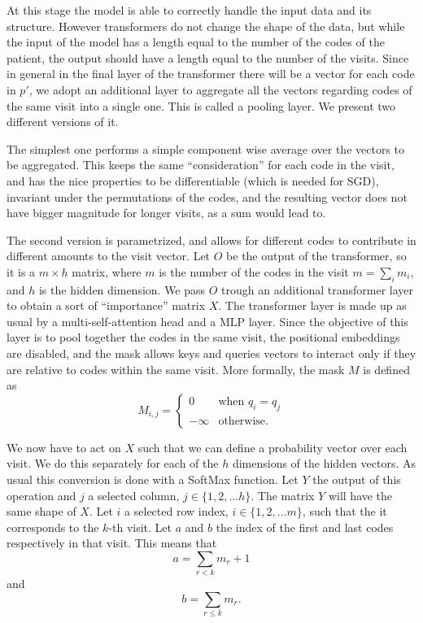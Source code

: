 \documentclass[]{marticle}
\begin{document}
At this stage the model is able to correctly handle the input data and its structure. However
transformers do not change the shape of the data, but while the input of the model has a length
equal to the number of the codes of the patient, the output should have a length equal to the number
of the visits. Since in general in the final layer of the transformer there will be a vector for
each code in $p'$, we adopt an additional layer to aggregate all the vectors regarding codes of the
same visit into a single one. This is called a pooling layer. We present two different versions of
it.

The simplest one performs a simple component wise average over the vectors to be aggregated. This
keeps the same ``consideration'' for each code in the visit, and has the nice properties to be
differentiable (which is needed for SGD), invariant under the permutations of the codes, and
the resulting vector does not have bigger magnitude for longer visits, as a sum would lead to.

The second version is parametrized, and allows for different codes to contribute in different
amounts to the visit vector. Let $O$ be the output of the transformer, so it is a $m \times h$
matrix, where $m$ is the number of the codes in the visit $m=\sum_i m_i$, and $h$ is the hidden
dimension. We pass $O$ trough an additional transformer layer to obtain a sort of ``importance''
matrix $X$. The transformer layer is made up as usual by a multi-self-attention head and a MLP
layer. Since the objective of this layer is to pool together the codes in the same visit, the
positional embeddings are disabled, and the mask allows keys and queries vectors to interact only if
they are relative to codes within the same visit. More formally, the mask $M$ is defined as 
\begin{equation*}
    M_{i,j} = \begin{cases}
        0       & \text{when $q_i = q_j$} \\
        -\infty & \text{otherwise.}
    \end{cases}
\end{equation*}

We now have to act on $X$ such that we can define a probability vector over each visit. We do this
separately for each of the $h$ dimensions of the hidden vectors. As usual this conversion is done
with a SoftMax function. Let $Y$ the output of this operation and $j$ a selected column,
$j\in\{1,2,\dots h\}$. The matrix $Y$ will have the same shape of $X$. Let $i$ a selected row index,
$i\in \{1,2,\dots m\}$, such that the it corresponds to the $k$-th visit. Let $a$ and $b$ the index
of the first and last codes respectively in that visit. This means that 
\begin{equation*}
    a = \sum_{r < k} m_r + 1
\end{equation*}
and 
\begin{equation*}
    b = \sum_{r \leq k} m_r.
\end{equation*}
\end{document}
